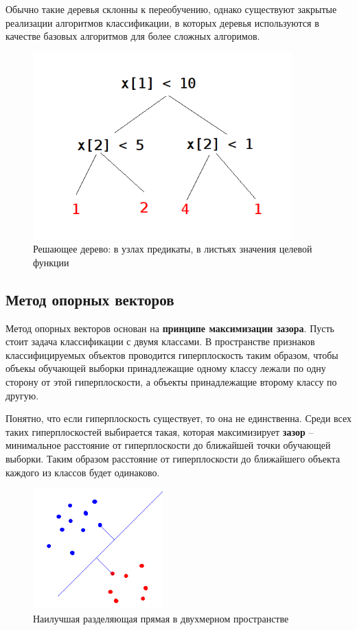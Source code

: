 Обычно такие деревья склонны к переобучению, однако существуют закрытые реализации алгоритмов классификации, в которых деревья используются в качестве базовых алгоритмов для более сложных алгоримов.
\begin{figure}[h]
\begin{center}
\includegraphics[width=10cm]{img/d_tree}
\end{center}
\caption{Решающее дерево: в узлах предикаты, в листьях значения целевой функции}
\label{d_tree}
\end{figure}

\subsection{Метод опорных векторов}
Метод опорных векторов основан на \textbf{принципе максимизации зазора}. Пусть стоит задача классификации с двумя классами. В пространстве признаков классифицируемых объектов проводится гиперплоскость таким образом, чтобы объекы обучающей выборки принадлежащие одному классу лежали по одну сторону от этой гиперплоскости, а объекты принадлежащие второму классу по другую.

Понятно, что если гиперплоскость существует, то она не единственна. Среди всех таких гиперплоскостей выбирается такая, которая максимизирует \textbf{зазор} -- минимальное расстояние от гиперплоскости до ближайшей точки обучающей выборки. Таким образом расстояние от гиперплоскости до ближайшего объекта каждого из классов будет одинаково.

\begin{figure}[h]
\begin{center}
\includegraphics[width=5cm]{img/svm}
\end{center}
\caption{Наилучшая разделяющая прямая в двухмерном пространстве}
\label{svm}
\end{figure}

